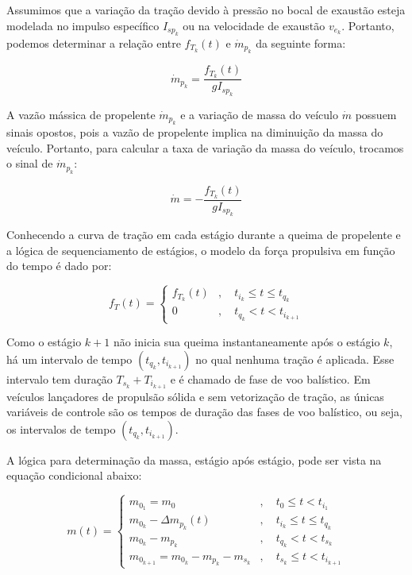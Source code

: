 Assumimos que a variação da tração devido à pressão no bocal de exaustão esteja modelada no impulso específico $I_{sp_{k}}$ ou na velocidade de exaustão $v_{e_{k}}$. Portanto, podemos determinar a relação entre $f_{T_{k}}(t)$ e $\dot{m}_{p_{k}}$ da seguinte forma:

\begin{equation}
\dot{m}_{p_{k}} = \frac{f_{T_{k}}(t)}{g I_{sp_{k}}}
\end{equation}

A vazão mássica de propelente $\dot{m}_{p_{k}}$ e a variação de massa do veículo $\dot{m}$ possuem sinais opostos, pois a vazão de propelente implica na diminuição da massa do veículo. Portanto, para calcular a taxa de variação da massa do veículo, trocamos o sinal de $\dot{m}_{p_{k}}$:

\begin{equation}
\dot{m} = -\frac{f_{T_{k}}(t)}{g I_{sp_{k}}}
\label{eq:252}
\end{equation}

Conhecendo a curva de tração em cada estágio durante a queima de propelente e a lógica de sequenciamento de estágios, o modelo da força propulsiva em função do tempo é dado por:

\begin{equation}
f_{T}(t) = 
\begin{cases}
f_{T_{k}}(t) & , \quad t_{i_{k}} \leq t \leq t_{q_{k}} \\
0 & , \quad t_{q_{k}} < t < t_{i_{k+1}}
\end{cases}
\end{equation}

Como o estágio $k+1$ não inicia sua queima instantaneamente após o estágio $k$, há um intervalo de tempo $\left(t_{q_{k}}, t_{i_{k+1}}\right)$ no qual nenhuma tração é aplicada. Esse intervalo tem duração $T_{s_{k}}+T_{i_{k+1}}$ e é chamado de fase de voo balístico. Em veículos lançadores de propulsão sólida e sem vetorização de tração, as únicas variáveis de controle são os tempos de duração das fases de voo balístico, ou seja, os intervalos de tempo $\left(t_{q_{k}}, t_{i_{k+1}}\right)$.

A lógica para determinação da massa, estágio após estágio, pode ser vista na equação condicional abaixo:

\begin{equation}
m(t) = 
\begin{cases}
m_{0_{1}} = m_{0} & , \quad t_{0} \leq t < t_{i_{1}} \\
m_{0_{k}} - \Delta m_{p_{k}}(t) & , \quad t_{i_{k}} \leq t \leq t_{q_{k}} \\
m_{0_{k}} - m_{p_{k}} & , \quad t_{q_{k}} < t < t_{s_{k}} \\
m_{0_{k+1}} = m_{0_{k}} - m_{p_{k}} - m_{s_{k}} & , \quad t_{s_{k}} \leq t < t_{i_{k+1}}
\label{eq:516}
\end{cases}
\end{equation}



